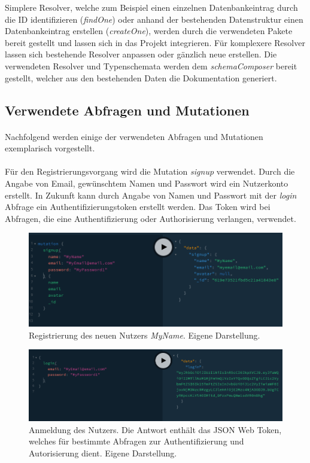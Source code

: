 Simplere Resolver, welche zum Beispiel einen einzelnen Datenbankeintrag durch die ID identifizieren (\textit{findOne}) oder anhand der bestehenden Datenstruktur einen Datenbankeintrag erstellen (\textit{createOne}), werden durch die verwendeten Pakete bereit gestellt und lassen sich in das Projekt integrieren.
Für komplexere Resolver lassen sich bestehende Resolver anpassen oder gänzlich neue erstellen.
Die verwendeten Resolver und Typenschemata werden dem \textit{schemaComposer} bereit gestellt, welcher aus den bestehenden Daten die Dokumentation generiert.


\subsection{Verwendete Abfragen und Mutationen}
\paragraph{}
Nachfolgend werden einige der verwendeten Abfragen und Mutationen exemplarisch vorgestellt.

\paragraph{}
Für den Registrierungsvorgang wird die Mutation \textit{signup} verwendet.
Durch die Angabe von Email, gewünschtem Namen und Passwort wird ein Nutzerkonto erstellt.
In Zukunft kann durch Angabe von Namen und Passwort mit der \textit{login} Abfrage ein Authentifizierungstoken erstellt werden. Das Token wird bei Abfragen, die eine Authentifizierung oder Authorisierung verlangen, verwendet.

\begin{figure}
	\centering
    \includegraphics[width=\textwidth]{sources/graphiql_signup.png}
	\caption{Registrierung des neuen Nutzers \textit{MyName}. Eigene Darstellung.}
	\label{fig:gql:2}
\end{figure}

\begin{figure}
	\centering
    \includegraphics[width=\textwidth]{sources/graphiql_login.png}
	\caption{Anmeldung des Nutzers. Die Antwort enthält das JSON Web Token, welches für bestimmte Abfragen zur Authentifizierung und Autorisierung dient. Eigene Darstellung.}
	\label{fig:gql:3}
\end{figure}

